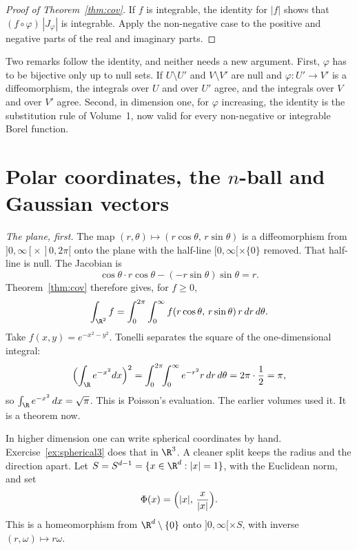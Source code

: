 \begin{proof}[Proof of Theorem~\ref{thm:cov}]
If $f$ is integrable, the identity for $|f|$ shows that $(f\circ\varphi)\,|J_\varphi|$ is integrable. Apply the non-negative case to the positive and negative parts of the real and imaginary parts.
\end{proof}

Two remarks follow the identity, and neither needs a new argument. First, $\varphi$ has to be bijective only up to null sets. If $U\setminus U'$ and $V\setminus V'$ are null and $\varphi:U'\to V'$ is a diffeomorphism, the integrals over $U$ and over $U'$ agree, and the integrals over $V$ and over $V'$ agree. Second, in dimension one, for $\varphi$ increasing, the identity is the substitution rule of Volume~1, now valid for every non-negative or integrable Borel function.

\section{Polar coordinates, the \texorpdfstring{$n$}{n}-ball and Gaussian vectors}

\emph{The plane, first.} The map $(r,\theta)\mapsto(r\cos\theta,\,r\sin\theta)$ is a diffeomorphism from $]0,\infty[\times\,]0,2\pi[$ onto the plane with the half-line $[0,\infty[\times\{0\}$ removed. That half-line is null. The Jacobian is
\[
\cos\theta\cdot r\cos\theta-(-r\sin\theta)\sin\theta=r.
\]
Theorem~\ref{thm:cov} therefore gives, for $f\ge 0$,
\[
\int_{\R^2}f=\int_0^{2\pi}\int_0^\infty f(r\cos\theta,\,r\sin\theta)\,r\,dr\,d\theta.
\]
Take $f(x,y)=e^{-x^2-y^2}$. Tonelli separates the square of the one-dimensional integral:
\[\Bigl(\int_\R e^{-x^2}dx\Bigr)^2=\int_0^{2\pi}\!\!\int_0^\infty e^{-r^2}r\,dr\,d\theta=2\pi\cdot\frac12=\pi,\]
so $\int_\R e^{-x^2}\,dx=\sqrt\pi$. This is Poisson's evaluation. The earlier volumes used it. It is a theorem now.

In higher dimension one can write spherical coordinates by hand. Exercise~\ref{ex:spherical3} does that in $\R^3$. A cleaner split keeps the radius and the direction apart. Let $S=S^{d-1}=\{x\in\R^d:|x|=1\}$, with the Euclidean norm, and set
\[
\Phi(x)=\Bigl(|x|,\,\frac{x}{|x|}\Bigr).
\]
This is a homeomorphism from $\R^d\setminus\{0\}$ onto $]0,\infty[\times S$, with inverse $(r,\omega)\mapsto r\omega$.

